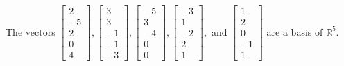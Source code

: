 \begin{exercise}
\begin{exerciseStatement}
  \end{exerciseStatement}
  \begin{exerciseAnswer}
   The vectors \(\left[\begin{array}{r}
2 \\
-5 \\
2 \\
0 \\
4
\end{array}\right] , \left[\begin{array}{r}
3 \\
3 \\
-1 \\
-1 \\
-3
\end{array}\right] , \left[\begin{array}{r}
-5 \\
3 \\
-4 \\
0 \\
0
\end{array}\right] , \left[\begin{array}{r}
-3 \\
1 \\
-2 \\
2 \\
1
\end{array}\right] , \text{ and } \left[\begin{array}{r}
1 \\
2 \\
0 \\
-1 \\
1
\end{array}\right]\) 
  	 are  a basis of \(\mathbb{R}^5\).
  


  \end{exerciseAnswer}
\end{exercise}